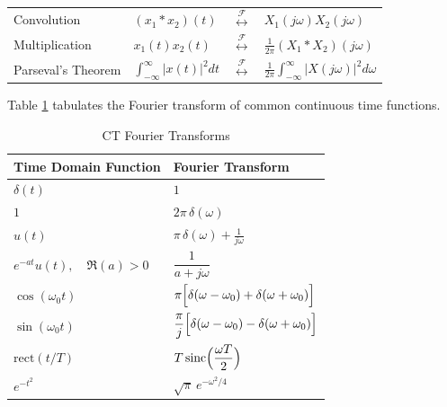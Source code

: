 \begin{table}[ht]
\begin{tabular}{llll}
        Convolution        & $(x_1 * x_2)(t)$                    & $\overset{\mathcal{F}}{\leftrightarrow}$ & $X_1(j\omega) X_2(j\omega)$                                   \\[1mm]
        Multiplication     & $x_1(t)x_2(t)$                      & $\overset{\mathcal{F}}{\leftrightarrow}$ & $\frac{1}{2\pi}(X_1 * X_2)(j\omega)$                          \\[1mm]
        Parseval's Theorem & $\int_{-\infty}^\infty |x(t)|^2 dt$ & $\overset{\mathcal{F}}{\leftrightarrow}$ & $\frac{1}{2\pi} \int_{-\infty}^\infty |X(j\omega)|^2 d\omega$ \\
        \bottomrule
    \end{tabular}
\end{table}

Table \ref{tab:ctfourier_transforms} tabulates the
Fourier transform of common continuous time functions.

\begin{table}[ht]
    \centering
    \caption{CT Fourier Transforms}
    \label{tab:ctfourier_transforms}
    \begin{tabular}{ll}
        \toprule
        \textbf{Time Domain Function} & \textbf{Fourier Transform}                                                    \\
        \midrule
        $\delta(t)$                   & $1$                                                                           \\[1mm]
        $1$                           & $2\pi\,\delta(\omega)$                                                        \\[1mm]
        $u(t)$                        & $\pi\,\delta(\omega) + \frac{1}{j\omega}$                                     \\[1mm]
        $e^{-at}u(t),\quad \Re(a)>0$  & $\dfrac{1}{a+j\omega}$                                                        \\[1mm]
        $\cos(\omega_0 t)$            & $\pi\Bigl[\delta(\omega-\omega_0) + \delta(\omega+\omega_0)\Bigr]$            \\[1mm]
        $\sin(\omega_0 t)$            & $\dfrac{\pi}{j}\Bigl[\delta(\omega-\omega_0) - \delta(\omega+\omega_0)\Bigr]$ \\[1mm]
        $\mathrm{rect}(t/T)$          & $T\,\mathrm{sinc}\Bigl(\dfrac{\omega T}{2}\Bigr)$                             \\[1mm]
        $e^{-t^2}$                    & $\sqrt{\pi}\,e^{-\omega^2/4}$                                                 \\
        \bottomrule
    \end{tabular}
\end{table}

